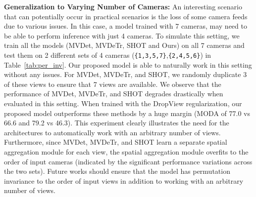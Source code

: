 \documentclass[letterpaper, 10 pt, conference]{ieeeconf}  \usepackage{times}
\begin{document}
\textbf{Generalization to Varying Number of Cameras:} An interesting scenario that can potentially occur in practical scenarios is the loss of some camera feeds due to various issues. In this case, a model trained with 7 cameras, may need to be able to perform inference with just 4 cameras. To simulate this setting, we train all the models (MVDet, MVDeTr, SHOT and Ours) on all 7 cameras and test them on 2 different sets of 4 cameras (\texttt{\{1,3,5,7\}},\texttt{\{2,4,5,6\}}) in Table~\ref{tab:per_inv}. Our proposed model is able to naturally work in this setting without any issues. For MVDet, MVDeTr, and SHOT, we randomly duplicate 3 of these views to ensure that 7 views are available. We observe that the performance of MVDet, MVDeTr, and SHOT degrades drastically when evaluated in this setting. When trained with the DropView regularization, our proposed model outperforms these methods by a huge margin (MODA of 77.0 vs 66.6 and 79.2 vs 46.3). This experiment clearly illustrates the need for the architectures to automatically work with an arbitrary number of views. Furthermore, since MVDet, MVDeTr, and SHOT learn a separate spatial aggregation module for each view, the spatial aggregation module overfits to the order of input cameras (indicated by the significant performance variations across the two sets). Future works should ensure that the model has permutation invariance to the order of input views in addition to working with an arbitrary number of views.
\end{document}
